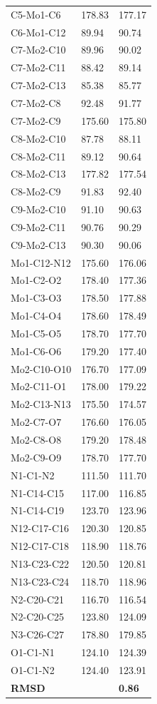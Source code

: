 \begin{longtable}{lll}
C5-Mo1-C6 & 178.83 & 177.17 \\
C6-Mo1-C12 & 89.94 & 90.74 \\
C7-Mo2-C10 & 89.96 & 90.02 \\
C7-Mo2-C11 & 88.42 & 89.14 \\
C7-Mo2-C13 & 85.38 & 85.77 \\
C7-Mo2-C8 & 92.48 & 91.77 \\
C7-Mo2-C9 & 175.60 & 175.80 \\
C8-Mo2-C10 & 87.78 & 88.11 \\
C8-Mo2-C11 & 89.12 & 90.64 \\
C8-Mo2-C13 & 177.82 & 177.54 \\
C8-Mo2-C9 & 91.83 & 92.40 \\
C9-Mo2-C10 & 91.10 & 90.63 \\
C9-Mo2-C11 & 90.76 & 90.29 \\
C9-Mo2-C13 & 90.30 & 90.06 \\
Mo1-C12-N12 & 175.60 & 176.06 \\
Mo1-C2-O2 & 178.40 & 177.36 \\
Mo1-C3-O3 & 178.50 & 177.88 \\
Mo1-C4-O4 & 178.60 & 178.49 \\
Mo1-C5-O5 & 178.70 & 177.70 \\
Mo1-C6-O6 & 179.20 & 177.40 \\
Mo2-C10-O10 & 176.70 & 177.09 \\
Mo2-C11-O1 & 178.00 & 179.22 \\
Mo2-C13-N13 & 175.50 & 174.57 \\
Mo2-C7-O7 & 176.60 & 176.05 \\
Mo2-C8-O8 & 179.20 & 178.48 \\
Mo2-C9-O9 & 178.70 & 177.70 \\
N1-C1-N2 & 111.50 & 111.70 \\
N1-C14-C15 & 117.00 & 116.85 \\
N1-C14-C19 & 123.70 & 123.96 \\
N12-C17-C16 & 120.30 & 120.85 \\
N12-C17-C18 & 118.90 & 118.76 \\
N13-C23-C22 & 120.50 & 120.81 \\
N13-C23-C24 & 118.70 & 118.96 \\
N2-C20-C21 & 116.70 & 116.54 \\
N2-C20-C25 & 123.80 & 124.09 \\
N3-C26-C27 & 178.80 & 179.85 \\
O1-C1-N1 & 124.10 & 124.39 \\
O1-C1-N2 & 124.40 & 123.91 \\ \hline
\textbf{RMSD} & \textbf{} & \textbf{0.86}
\end{longtable}


